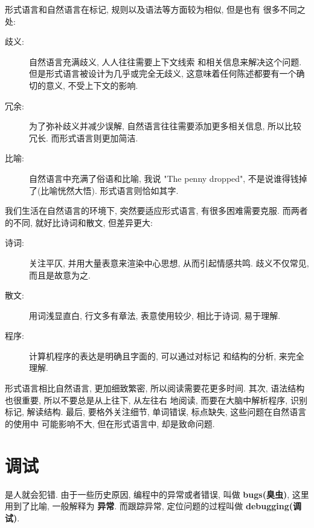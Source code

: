 \documentclass[10pt]{book}
\begin{document}
形式语言和自然语言在标记, 规则以及语法等方面较为相似, 但是也有
很多不同之处:

\begin{description}

\item[歧义:] 自然语言充满歧义, 人人往往需要上下文线索
和相关信息来解决这个问题. 但是形式语言被设计为几乎或完全无歧义, 
这意味着任何陈述都要有一个确切的意义, 不受上下文的影响. 

\item[冗余:] 为了弥补歧义并减少误解, 
自然语言往往需要添加更多相关信息, 所以比较冗长. 
而形式语言则更加简洁. 

\item[比喻:] 自然语言中充满了俗语和比喻, 我说 "The penny dropped", 
不是说谁得钱掉了(比喻恍然大悟). 形式语言则恰如其字. 

\end{description}

我们生活在自然语言的环境下, 突然要适应形式语言, 有很多困难需要克服. 
而两者的不同, 就好比诗词和散文, 但差异更大:  

\begin{description}

\item[诗词:] 关注平仄, 并用大量表意来渲染中心思想, 从而引起情感共鸣.
歧义不仅常见, 而且是故意为之. 

\item[散文:] 用词浅显直白, 行文多有章法, 表意使用较少, 相比于诗词, 易于理解. 

\item[程序:] 计算机程序的表达是明确且字面的, 可以通过对标记
和结构的分析, 来完全理解. 


\end{description}

形式语言相比自然语言, 更加细致繁密, 所以阅读需要花更多时间. 
其次, 语法结构也很重要, 所以不要总是从上往下, 从左往右
地阅读, 而要在大脑中解析程序, 识别标记, 解读结构. 
最后, 要格外关注细节, 单词错误, 标点缺失, 这些问题在自然语言的使用中
可能影响不大, 但在形式语言中, 却是致命问题. 

\section{调试}

是人就会犯错. 由于一些历史原因, 编程中的异常或者错误, 叫做 {\bf bugs(臭虫)}, 
这里用到了比喻, 一般解释为 {\bf 异常}. 
而跟踪异常, 定位问题的过程叫做 {\bf debugging(调试)}. 
\end{document}
